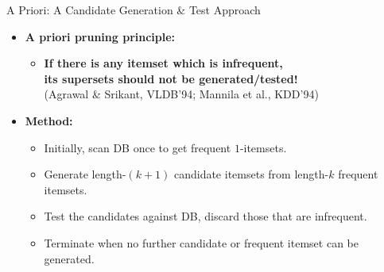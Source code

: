\begin{frame}{A Priori: A Candidate Generation \& Test Approach}
	\begin{itemize}
		\item \textbf{A priori pruning principle:}
		      \begin{itemize}
			      \item \textbf{\color{airforceblue}If there is any itemset which is
				            infrequent, \\ its supersets should not be generated/tested!} \\
			            (Agrawal \& Srikant, VLDB'94; Mannila et al., KDD'94)
		      \end{itemize}
		\item \textbf{Method:}
		      \begin{itemize}
			      \item Initially, scan DB once to get frequent $1$-itemsets.
			      \item Generate length-$(k+1)$ candidate itemsets from length-$k$
			            frequent itemsets.
			      \item Test the candidates against DB, discard those that are
			            infrequent.
			      \item Terminate when no further candidate or frequent itemset can
			            be generated.
		      \end{itemize}
	\end{itemize}
\end{frame}

